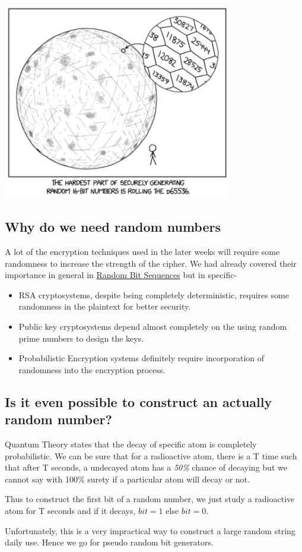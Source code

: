 \begin{center}
	\includegraphics[width=0.75\textwidth]{Photos/random.png}
\end{center}
		\subsection{Why do we need random numbers}
			A lot of the encryption techniques used in the later weeks will require some randomness to increase the strength of the cipher. We had already covered their importance in general in \textcolor{teal}{\hyperref[subsec:random]{Random Bit Sequences}} but in specific-
			\begin{itemize}
				\item RSA cryptosystems, despite being completely deterministic, requires some randomness in the plaintext for better security.
				\item Public key cryptosystems depend almost completely on the using random prime numbers to design the keys.
				\item Probabilistic Encryption systems definitely require incorporation of randomness into the encryption process.
			\end{itemize}

		\subsection{Is it even possible to construct an actually random number?}
			Quantum Theory states that the decay of specific atom is completely probabilistic. We can be sure that for a radioactive atom, there is a T time such that after T seconds, a undecayed atom has a \emph{50\%} chance of decaying but we cannot say with 100\% surety if a particular atom will decay or not.\par
			Thus to construct the first bit of a random number, we just study a radioactive atom for T seconds and if it decays, $bit = 1$ else $bit = 0$. \par
			Unfortunately, this is a very impractical way to construct a large random string daily use. Hence we go for pseudo random bit generators.

